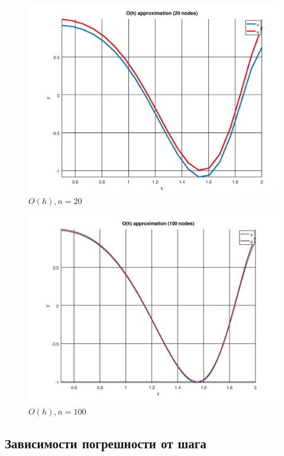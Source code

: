 \documentclass[12pt]{article}
\begin{document}
\begin{figure}
\begin{center}
\includegraphics[scale = 0.5]{h1_20.jpg} 
\end{center}
\caption{$O(h), n = 20$ }
\end{figure}

\begin{figure}
\begin{center}
\includegraphics[scale = 0.5]{h1_100.jpg} 
\end{center}
\caption{$O(h), n = 100$}
\end{figure}


\pagebreak

\subsection{Зависимости погрешности от шага}
\end{document}
